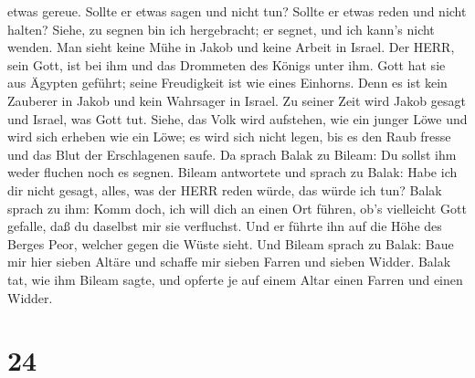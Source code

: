 etwas gereue. Sollte er etwas sagen und nicht tun? Sollte er etwas reden
und nicht halten?  Siehe, zu segnen bin ich hergebracht; er
segnet, und ich kann's nicht wenden.  Man sieht keine Mühe
in Jakob und keine Arbeit in Israel. Der HERR, sein Gott, ist bei ihm
und das Drommeten des Königs unter ihm.  Gott hat sie aus
Ägypten geführt; seine Freudigkeit ist wie eines Einhorns. 
Denn es ist kein Zauberer in Jakob und kein Wahrsager in Israel. Zu
seiner Zeit wird Jakob gesagt und Israel, was Gott tut. 
Siehe, das Volk wird aufstehen, wie ein junger Löwe und wird sich
erheben wie ein Löwe; es wird sich nicht legen, bis es den Raub fresse
und das Blut der Erschlagenen saufe.  Da sprach Balak zu
Bileam: Du sollst ihm weder fluchen noch es segnen.  Bileam
antwortete und sprach zu Balak: Habe ich dir nicht gesagt, alles, was
der HERR reden würde, das würde ich tun?  Balak sprach zu
ihm: Komm doch, ich will dich an einen Ort führen, ob's vielleicht Gott
gefalle, daß du daselbst mir sie verfluchst.  Und er führte
ihn auf die Höhe des Berges Peor, welcher gegen die Wüste sieht.
 Und Bileam sprach zu Balak: Baue mir hier sieben Altäre
und schaffe mir sieben Farren und sieben Widder.  Balak
tat, wie ihm Bileam sagte, und opferte je auf einem Altar einen Farren
und einen Widder.

\hypertarget{section-23}{%
\section{24}\label{section-23}}


